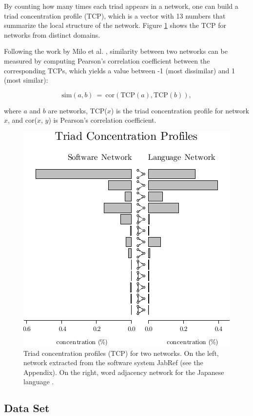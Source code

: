 By counting how many times each triad appears in a network, one can build a
triad concentration profile (TCP), which is a vector with 13 numbers that
summarize the local structure of the network. Figure \ref{fig:profiles} shows
the TCP for networks from distinct domains.

Following the work by Milo et al. \cite{Milo2004}, similarity between two
networks can be measured by computing Pearson's correlation coefficient between
the corresponding TCPs, which yields a value between -1 (most dissimilar) and 1
(most similar):

$$
\mathrm{sim}(a, b) ~=~ \mathrm{cor}(\mathrm{TCP}(a), \mathrm{TCP}(b))\mathrm{,}
$$

where $a$ and $b$ are networks, TCP($x$) is the triad concentration profile for
network $x$, and cor($x$, $y$) is Pearson's correlation coefficient.

\begin{figure}[!t]
\center
\includegraphics{tcp}
\caption{Triad concentration profiles (TCP) for two networks. On the left,
network extracted from the software system JabRef (see the Appendix). On the
right, word adjacency network for the Japanese language \cite{Milo2004}.}
\label{fig:profiles}
\end{figure}

\subsection{Data Set}


